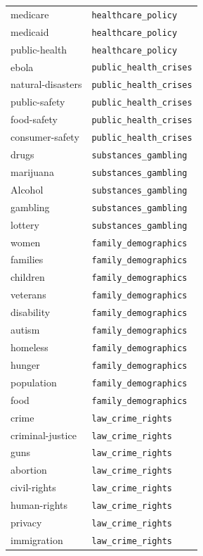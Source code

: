 \begin{longtable}{ll}
medicare & \texttt{healthcare\_policy} \\
medicaid & \texttt{healthcare\_policy} \\
public-health & \texttt{healthcare\_policy} \\
\midrule
ebola & \texttt{public\_health\_crises} \\
natural-disasters & \texttt{public\_health\_crises} \\
public-safety & \texttt{public\_health\_crises} \\
food-safety & \texttt{public\_health\_crises} \\
consumer-safety & \texttt{public\_health\_crises} \\
\midrule
drugs & \texttt{substances\_gambling} \\
marijuana & \texttt{substances\_gambling} \\
Alcohol & \texttt{substances\_gambling} \\
gambling & \texttt{substances\_gambling} \\
lottery & \texttt{substances\_gambling} \\
\midrule
women & \texttt{family\_demographics} \\
families & \texttt{family\_demographics} \\
children & \texttt{family\_demographics} \\
veterans & \texttt{family\_demographics} \\
disability & \texttt{family\_demographics} \\
autism & \texttt{family\_demographics} \\
homeless & \texttt{family\_demographics} \\
hunger & \texttt{family\_demographics} \\
population & \texttt{family\_demographics} \\
food & \texttt{family\_demographics} \\
\midrule
crime & \texttt{law\_crime\_rights} \\
criminal-justice & \texttt{law\_crime\_rights} \\
guns & \texttt{law\_crime\_rights} \\
abortion & \texttt{law\_crime\_rights} \\
civil-rights & \texttt{law\_crime\_rights} \\
human-rights & \texttt{law\_crime\_rights} \\
privacy & \texttt{law\_crime\_rights} \\
immigration & \texttt{law\_crime\_rights} \\

\end{longtable}
